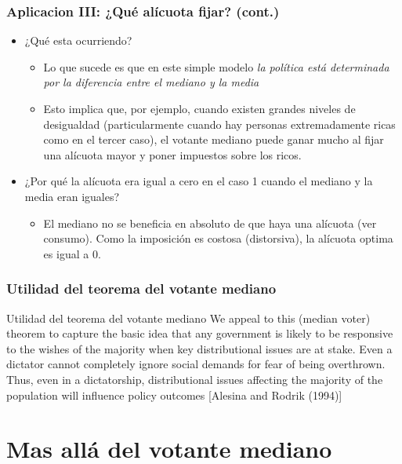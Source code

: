 \documentclass[14pt,aspectratio=169]{beamer}
\begin{document}
\begin{frame}\frametitle{Aplicacion III: ¿Qué alícuota fijar? (cont.)}
\begin{itemize}
\item ¿Qué esta ocurriendo? 
\begin{itemize}
\item Lo que sucede es que en este simple modelo \textit{la política está determinada por la
  diferencia entre el mediano y la media}
\item Esto implica que, por ejemplo, cuando existen grandes niveles de
  desigualdad (particularmente cuando hay personas extremadamente
  ricas como en el tercer caso), el votante mediano puede ganar mucho
  al fijar una alícuota mayor y poner impuestos sobre los ricos. 
\end{itemize}
\item ¿Por qué la alícuota era igual a cero en el caso 1 cuando el
  mediano y la media eran iguales?
\begin{itemize}\itemsep 5pt \medskip
\item El mediano no se beneficia en absoluto de que haya una alícuota
  (ver consumo). Como la imposición es costosa (distorsiva), la
  alícuota optima es igual a 0. 
\end{itemize}
\end{itemize}
\end{frame}


\begin{frame}\frametitle{Utilidad del teorema del votante mediano}
\begin{block}{Utilidad del teorema del votante mediano}
We appeal to this (median voter) theorem to capture the basic idea that
any government is likely to be responsive to the wishes of the majority when
key distributional issues are at stake. Even a dictator cannot completely
ignore social demands for fear of being overthrown. Thus, even in a
dictatorship, distributional issues affecting the majority of the population
will influence policy outcomes [Alesina and Rodrik (1994)]
\end{block}
\end{frame}


\section{Mas allá del votante mediano}
\end{document}
